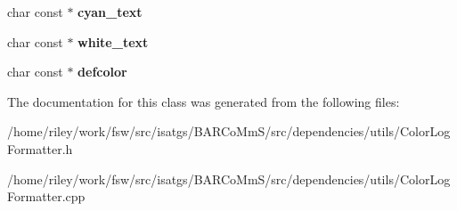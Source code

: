 \begin{DoxyCompactItemize}
\item 
char const $\ast$ {\bfseries cyan\+\_\+text}\hypertarget{classisat__utils_1_1_color_log_formatter_a748935b1b9a62986c1258a7d934c6ee1}{}\label{classisat__utils_1_1_color_log_formatter_a748935b1b9a62986c1258a7d934c6ee1}

\item 
char const $\ast$ {\bfseries white\+\_\+text}\hypertarget{classisat__utils_1_1_color_log_formatter_a4f9772879949d46d83b92674036a4165}{}\label{classisat__utils_1_1_color_log_formatter_a4f9772879949d46d83b92674036a4165}

\item 
char const $\ast$ {\bfseries defcolor}\hypertarget{classisat__utils_1_1_color_log_formatter_a8d271da6410a39fb1f43985a629ab4fe}{}\label{classisat__utils_1_1_color_log_formatter_a8d271da6410a39fb1f43985a629ab4fe}

\end{DoxyCompactItemize}


The documentation for this class was generated from the following files\+:\begin{DoxyCompactItemize}
\item 
/home/riley/work/fsw/src/isatgs/\+B\+A\+R\+Co\+Mm\+S/src/dependencies/utils/Color\+Log\+Formatter.\+h\item 
/home/riley/work/fsw/src/isatgs/\+B\+A\+R\+Co\+Mm\+S/src/dependencies/utils/Color\+Log\+Formatter.\+cpp\end{DoxyCompactItemize}
